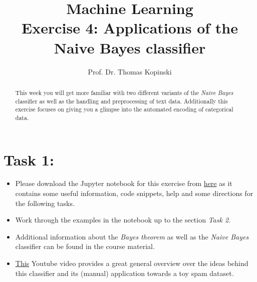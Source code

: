 \documentclass{article}
\title{Machine Learning \\ Exercise 4: Applications of the Naive Bayes classifier}
\author{Prof. Dr. Thomas Kopinski}
\begin{document}
\maketitle

\begin{abstract}
This week you will get more familiar with two different variants of the \emph{Naive Bayes} classifier as well as the handling and preprocessing of text data. Additionally this exercise focuses on giving you a glimpse into the automated encoding of categorical data.
\end{abstract}

\section*{Task 1:}
\begin{itemize}
    \item Please download the Jupyter notebook for this exercise from \href{https://github.com/DataScienceLabFHSWF/MachineLearningCourse/tree/main/notebooks/04}{here} as it contains some useful information, code snippets, help and some directions for the following tasks.
    \item Work through the examples in the notebook up to the section \emph{Task 2}. 
    \item Additional information about the \emph{Bayes theorem} as well as the \emph{Naive Bayes} classifier can be found in the course material.
    \item \href{https://www.youtube.com/watch?v=O2L2Uv9pdDA}{This} Youtube video provides a great general overview over the ideas behind this classifier and its (manual) application towards a toy spam dataset.
\end{itemize}
\end{document}
